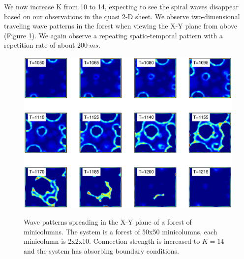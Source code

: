 We now increase K from 10 to 14, expecting to see the spiral waves disappear based on our observations in the quasi 2-D sheet.
We  observe two-dimensional traveling wave patterns in the forest when viewing the X-Y plane from above (Figure \ref{fig:ForestSpreadingWaves}).
We again observe a repeating spatio-temporal pattern with a repetition rate of about $200~ms$.

\begin{figure}[!htb]
 \caption{ Wave patterns spreading in the X-Y plane of a forest of minicolumns. 
           The system is a forest of 50x50 minicolumns, each minicolumn is 2x2x10. 
           Connection strength is increased to $K=14$ and the system has absorbing boundary conditions. 
           }
   \includegraphics[width=\textwidth]{fig/Forest_SpreadingWaves_K14_Sep2p5}
   \label{fig:ForestSpreadingWaves}
\end{figure}
\FloatBarrier


